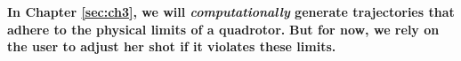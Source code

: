\begin{tcolorbox}[before skip=20pt, after skip=20pt, sharp corners]
\begin{center}
\textbf{In Chapter \ref{sec:ch3}, we will \emph{computationally} generate trajectories that adhere to the physical limits of a quadrotor.}
\textbf{But for now, we rely on the user to adjust her shot if it violates these limits.}
\end{center}
\end{tcolorbox}

